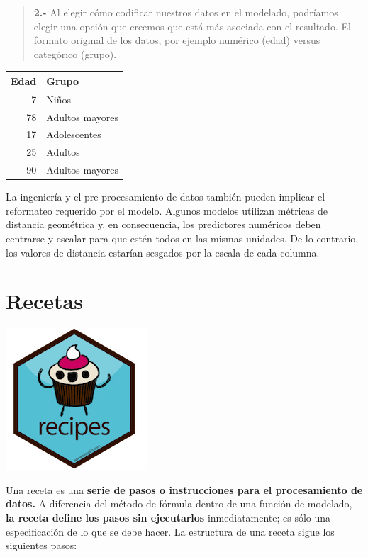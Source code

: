 \documentclass[
]{book}
\begin{document}
\begin{quote}
\textbf{2.-} Al elegir cómo codificar nuestros datos en el modelado, podríamos elegir una opción que creemos que está más asociada con el resultado. El formato original de los datos, por ejemplo numérico (edad) versus categórico (grupo).
\end{quote}

\begin{table}
\centering
\begin{tabular}[t]{r|l}
\hline
Edad & Grupo\\
\hline
7 & Niños\\
\hline
78 & Adultos mayores\\
\hline
17 & Adolescentes\\
\hline
25 & Adultos\\
\hline
90 & Adultos mayores\\
\hline
\end{tabular}
\end{table}

La ingeniería y el pre-procesamiento de datos también pueden implicar el reformateo requerido por el modelo. Algunos modelos utilizan métricas de distancia geométrica y, en consecuencia, los predictores numéricos deben centrarse y escalar para que estén todos en las mismas unidades. De lo contrario, los valores de distancia estarían sesgados por la escala de cada columna.

\hypertarget{recetas}{%
\section{Recetas}\label{recetas}}

\begin{flushleft}\includegraphics[width=150pt,height=150pt]{img/04-ml/3-2-3-recetas} \end{flushleft}

Una receta es una \textbf{serie de pasos o instrucciones para el procesamiento de datos.}
A diferencia del método de fórmula dentro de una función de modelado, \textbf{la receta define los pasos sin ejecutarlos} inmediatamente; es sólo una especificación de lo que se debe hacer. La estructura de una receta sigue los siguientes pasos:
\end{document}
